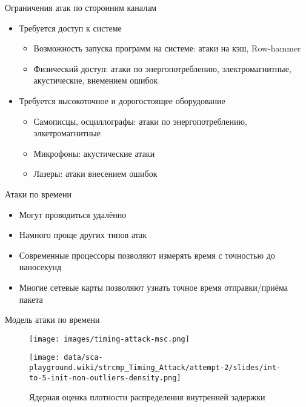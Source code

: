 \documentclass[14pt]{beamer}
\begin{document}
\begin{frame}{Ограничения атак по сторонним каналам}
    \begin{itemize}
        \item Требуется доступ к системе
            \begin{itemize}
                \item Возможность запуска программ на системе: атаки на кэш, Row-hammer
                \item Физический доступ: атаки по энергопотреблению, электромагнитные, акустические, внемением ошибок
            \end{itemize}
        \item Требуется высокоточное и дорогостоящее оборудование
            \begin{itemize}
                \item Самописцы, осциллографы: атаки по энергопотреблению, элкетромагнитные
                \item Микрофоны: акустические атаки
                \item Лазеры: атаки внесением ошибок
            \end{itemize}
    \end{itemize}
\end{frame}

\begin{frame}{Атаки по времени}
    \begin{itemize}
        \item Могут проводиться удалённо
        \item Намного проще других типов атак
        \item Современные процессоры позволяют измерять время с точностью до наносекунд
        \item Многие сетевые карты позволяют узнать точное время отправки/приёма пакета
    \end{itemize}
\end{frame}

\begin{frame}{Модель атаки по времени}
    \begin{figure}
        \centering
        \texttt{[image: images/timing-attack-msc.png]}
    \end{figure}
\end{frame}

\begin{frame}[nologo]
    \begin{figure}
        \centering
        \texttt{[image: data/sca-playground.wiki/strcmp\_Timing\_Attack/attempt-2/slides/int-to-5-init-non-outliers-density.png]}
        \caption{Ядерная оценка плотности распределения внутренней задержки}
    \end{figure}
\end{frame}
\end{document}
